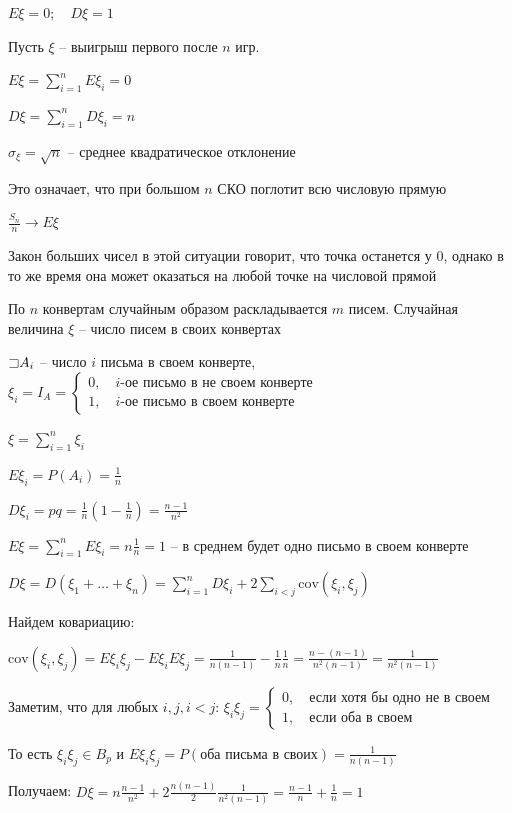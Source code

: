 \documentclass[12pt]{article}
\begin{document}
    $E\xi = 0; \quad D\xi = 1$

    Пусть $\xi$ -- выигрыш первого после $n$ игр.

    $E\xi = \sum_{i = 1}^n E\xi_i = 0$

    $D\xi = \sum_{i = 1}^n D\xi_i = n$

    $\sigma_\xi = \sqrt{n}$ -- среднее квадратическое отклонение

    Это означает, что при большом $n$ СКО поглотит всю числовую прямую

    $\frac{S_n}{n} \to E\xi$

    Закон больших чисел в этой ситуации говорит, что точка останется у 0, однако в то же время она может оказаться на любой точке на числовой прямой

    \Ex По $n$ конвертам случайным образом раскладывается $m$ писем. Случайная величина $\xi$ -- число писем в своих конвертах

    $\mathord{\sqsupset} A_i$ -- число $i$ письма в своем конверте, $\xi_i = I_A = \begin{cases}0, \quad i\text{-ое письмо в не своем конверте} \\ 1, \quad i\text{-ое письмо в своем конверте} \end{cases}$

    $\xi = \sum_{i = 1}^n \xi_i$

    $E\xi_i = P(A_i) = \frac{1}{n}$

    $D\xi_i = pq = \frac{1}{n} (1 - \frac{1}{n}) = \frac{n - 1}{n^2}$

    $E\xi = \sum_{i = 1}^n E\xi_i = n \frac{1}{n} = 1$ -- в среднем будет одно письмо в своем конверте

    $D\xi = D(\xi_1 + \dots + \xi_n) = \sum_{i = 1}^n D\xi_i + 2\sum_{i < j} \mathrm{cov} (\xi_i, \xi_j)$

    Найдем ковариацию:

    $\mathrm{cov}(\xi_i, \xi_j) = E\xi_i \xi_j - E\xi_i E\xi_j = \frac{1}{n(n - 1)} - \frac{1}{n}\frac{1}{n} = \frac{n - (n - 1)}{n^2(n - 1)} = \frac{1}{n^2(n - 1)}$

    Заметим, что для любых $i, j, i < j$: $\xi_i \xi_j = \begin{cases}0, \quad \text{если хотя бы одно не в своем} \\ 1, \quad \text{если оба в своем}\end{cases}$
    
    То есть $\xi_i\xi_j \in B_p$ и $E\xi_i \xi_j = P(\text{оба письма в своих}) = \frac{1}{n(n - 1)}$

    Получаем: $D\xi = n \frac{n - 1}{n^2} + 2\frac{n(n - 1)}{2}\frac{1}{n^2(n - 1)} = \frac{n - 1}{n} + \frac{1}{n} = 1$
\end{document}

